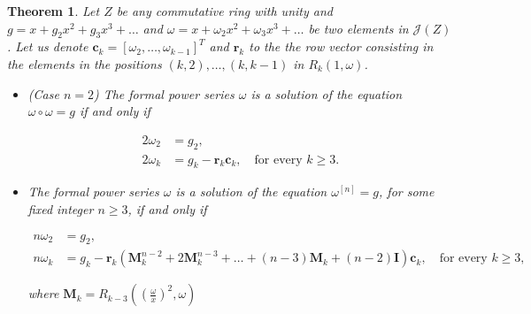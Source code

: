 \documentclass[preprint,12pt]{elsarticle}
\newtheorem{thm}{Theorem}
\begin{document}
\begin{thm} \label{theo.bf} Let $Z$ be any commutative ring with unity and $g=x+g_2x^2+g_3x^3+\ldots$ and $\omega=x+\omega_2x^2+\omega_3x^3+\ldots$ be two elements in $\mathcal J(Z)$. Let us denote $\bm c_k=[\omega_2,\ldots, \omega_{k-1}]^T$ and $\bm r_k$ to the the row vector consisting in the elements in the positions $(k,2),\ldots, (k,k-1)$ in $R_k(1,\omega)$.



\begin{itemize}

\item  (Case $n=2$) The formal power series $\omega$ is a solution of the equation $\omega\circ\omega=g$ if and only if

\begin{align}
2\omega_2 &= g_2, \tag{2.1a} \label{eq.heaven2} \\
2\omega_k &= g_k - \bm{r}_k \bm{c}_k, \quad \text{for every } k \geq 3. \tag{2.1b} \label{eq.hell2}
\end{align}










\item The formal power series $\omega$ is a solution of the equation $\omega^{[n]}=g$, for some fixed integer $n\geq 3$, if and only if  


\begin{align}
n\omega_2 & =g_2, \tag{2.1c}\label{eq.heaven}\\
n\omega_k & =g_k-\bm r_k(\bm M_k^{n-2}+2\bm M_k^{n-3}+\ldots+(n-3)\bm M_k+ (n-2)\bm I)\bm c_k, \quad \text{for every } k \geq 3,  \tag{2.1d}\label{eq.hell}
\end{align}



\noindent where $\bm M_k=R_{k-3}(\left(\frac{\omega}{x}\right)^2,\omega)$ 



\end{itemize}

\end{thm}
\end{document}
